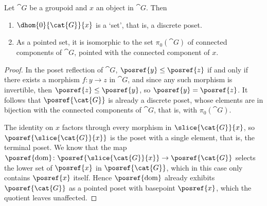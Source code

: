     \begingroup
    \def\theproposition{\ref{prop: dhom0 is pi0 for groupoids}}
    \begin{proposition}
        Let $\cat{G}$ be a groupoid and $x$ an object in $\cat{G}$.
        Then
        \begin{enumerate}
            \item $\dhom{0}{\cat{G}}{x}$ is a `set', that is, a discrete poset.
            \item As a pointed set, it is isomorphic to the set $\pi_0(\cat{G})$ of connected components of $\cat{G}$, pointed with the connected component of $x$.
        \end{enumerate}
    \end{proposition}
    \addtocounter{proposition}{-1}
    \endgroup
    \begin{proof}
        In the poset reflection of $\cat{G}$, $\posref{y} \leq \posref{z}$ if and only if there exists a morphism $f\colon y \to z$ in $\cat{G}$, and since any such morphism is invertible, then $\posref{z} \leq \posref{y}$, so $\posref{y} = \posref{z}$.
        It follows that $\posref{\cat{G}}$ is already a discrete poset, whose elements are in bijection with the connected components of $\cat{G}$, that is, with $\pi_0(\cat{G})$.
        
        The identity on $x$ factors through every morphism in $\slice{\cat{G}}{x}$, so $\posref{\slice{\cat{G}}{x}}$ is the poset with a single element, that is, the terminal poset.
        We know that the map $\posref{\mathrm{dom}}\colon \posref{\slice{\cat{G}}{x}} \to \posref{\cat{G}}$ selects the lower set of $\posref{x}$ in $\posref{\cat{G}}$, which in this case only contains $\posref{x}$ itself. 
        Hence $\posref{\mathrm{dom}}$ already exhibits $\posref{\cat{G}}$ as a pointed poset with basepoint $\posref{x}$, which the quotient leaves unaffected.
    \end{proof}

